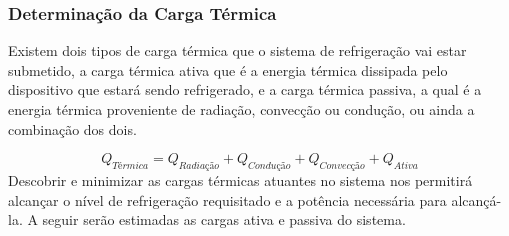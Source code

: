 \subsubsection{Determinação da Carga Térmica}
Existem dois tipos de carga térmica que o sistema de refrigeração vai estar submetido, a carga térmica ativa que é a energia térmica dissipada pelo dispositivo que estará sendo refrigerado, e a carga térmica passiva, a qual é a energia térmica proveniente de radiação, convecção ou condução, ou ainda a combinação dos dois. 

\begin{equation}
Q_{Térmica} = Q_{Radiação}+Q_{Condução}+Q_{Convecção}+Q_{Ativa}
\end{equation}
Descobrir e minimizar as cargas térmicas atuantes no sistema nos permitirá alcançar o nível de refrigeração requisitado e a potência necessária para alcançá-la. A seguir serão estimadas as cargas ativa e passiva do sistema.
